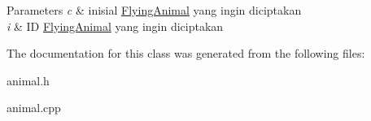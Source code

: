 \begin{DoxyParams}{Parameters}
{\em c} & inisial \hyperlink{classFlyingAnimal}{Flying\+Animal} yang ingin diciptakan \\
\hline
{\em i} & ID \hyperlink{classFlyingAnimal}{Flying\+Animal} yang ingin diciptakan \\
\hline
\end{DoxyParams}


The documentation for this class was generated from the following files\+:\begin{DoxyCompactItemize}
\item 
animal.\+h\item 
animal.\+cpp\end{DoxyCompactItemize}
